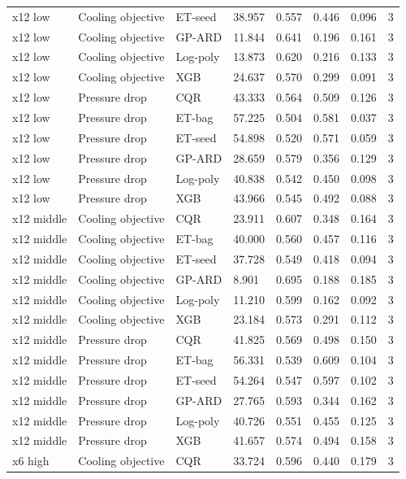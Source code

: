 \begin{longtable}{llllllll}
x12 low & Cooling objective & ET-seed & 38.957 & 0.557 & 0.446 & 0.096 & 3\\
x12 low & Cooling objective & GP-ARD & 11.844 & 0.641 & 0.196 & 0.161 & 3\\
x12 low & Cooling objective & Log-poly & 13.873 & 0.620 & 0.216 & 0.133 & 3\\
x12 low & Cooling objective & XGB & 24.637 & 0.570 & 0.299 & 0.091 & 3\\
x12 low & Pressure drop & CQR & 43.333 & 0.564 & 0.509 & 0.126 & 3\\
x12 low & Pressure drop & ET-bag & 57.225 & 0.504 & 0.581 & 0.037 & 3\\
x12 low & Pressure drop & ET-seed & 54.898 & 0.520 & 0.571 & 0.059 & 3\\
x12 low & Pressure drop & GP-ARD & 28.659 & 0.579 & 0.356 & 0.129 & 3\\
x12 low & Pressure drop & Log-poly & 40.838 & 0.542 & 0.450 & 0.098 & 3\\
x12 low & Pressure drop & XGB & 43.966 & 0.545 & 0.492 & 0.088 & 3\\
x12 middle & Cooling objective & CQR & 23.911 & 0.607 & 0.348 & 0.164 & 3\\
x12 middle & Cooling objective & ET-bag & 40.000 & 0.560 & 0.457 & 0.116 & 3\\
x12 middle & Cooling objective & ET-seed & 37.728 & 0.549 & 0.418 & 0.094 & 3\\
x12 middle & Cooling objective & GP-ARD & 8.901 & 0.695 & 0.188 & 0.185 & 3\\
x12 middle & Cooling objective & Log-poly & 11.210 & 0.599 & 0.162 & 0.092 & 3\\
x12 middle & Cooling objective & XGB & 23.184 & 0.573 & 0.291 & 0.112 & 3\\
x12 middle & Pressure drop & CQR & 41.825 & 0.569 & 0.498 & 0.150 & 3\\
x12 middle & Pressure drop & ET-bag & 56.331 & 0.539 & 0.609 & 0.104 & 3\\
x12 middle & Pressure drop & ET-seed & 54.264 & 0.547 & 0.597 & 0.102 & 3\\
x12 middle & Pressure drop & GP-ARD & 27.765 & 0.593 & 0.344 & 0.162 & 3\\
x12 middle & Pressure drop & Log-poly & 40.726 & 0.551 & 0.455 & 0.125 & 3\\
x12 middle & Pressure drop & XGB & 41.657 & 0.574 & 0.494 & 0.158 & 3\\
x6 high & Cooling objective & CQR & 33.724 & 0.596 & 0.440 & 0.179 & 3\\

\end{longtable}
